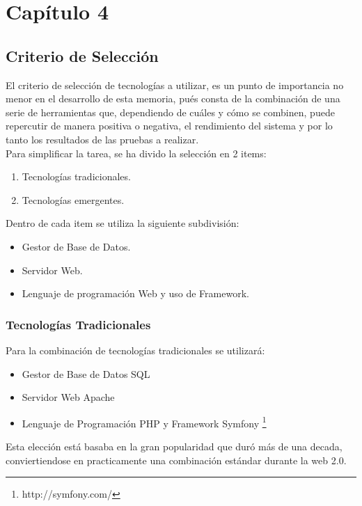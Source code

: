\chapter{Capítulo 4}

\section{Criterio de Selección}

El criterio de selección de tecnologías a utilizar, es un punto de importancia no menor en 
el desarrollo de esta memoria, pués consta de la combinación de una serie de herramientas que, 
dependiendo de cuáles y cómo se combinen, puede repercutir de manera positiva o negativa, el 
rendimiento del sistema y por lo tanto los resultados de las pruebas a realizar.\\

Para simplificar la tarea, se ha divido la selección en 2 items:
\begin{enumerate}
 \item Tecnologías tradicionales.
 \item Tecnologías emergentes.
\end{enumerate}

Dentro de cada item se utiliza la siguiente subdivisión:
\begin{itemize}
 \item Gestor de Base de Datos.
 \item Servidor Web.
 \item Lenguaje de programación Web y uso de Framework.
\end{itemize}



\subsection{Tecnologías Tradicionales}

Para la combinación de tecnologías tradicionales se utilizará:
\begin{itemize}
 \item Gestor de Base de Datos SQL
 \item Servidor Web Apache
 \item Lenguaje de Programación PHP y Framework Symfony \footnote{http://symfony.com/}
\end{itemize}

Esta elección está basaba en la gran popularidad que duró más de una decada, conviertiendose 
en practicamente una combinación estándar durante la web 2.0. \\

